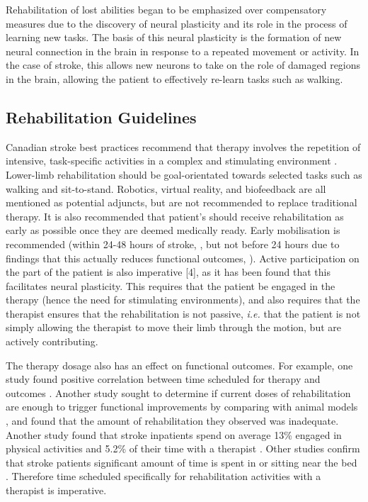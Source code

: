 \documentclass[12pt]{report}
\begin{document}
Rehabilitation of lost abilities began to be emphasized over compensatory measures due to the discovery of neural plasticity and its role in the process of learning new tasks. The basis of this neural plasticity is the formation of new neural connection in the brain in response to a repeated movement or activity. In the case of stroke, this allows new neurons to take on the role of damaged regions in the brain, allowing the patient to effectively re-learn tasks such as walking. 

\subsection{Rehabilitation Guidelines}

Canadian stroke best practices recommend that therapy involves the repetition of intensive, task-specific activities in a complex and stimulating environment \cite{Hebert2016}. Lower-limb rehabilitation should be goal-orientated towards selected tasks such as walking and sit-to-stand. Robotics, virtual reality, and biofeedback are all mentioned as potential adjuncts, but are not recommended to replace traditional therapy. It is also recommended that patient's should receive rehabilitation as early as possible once they are deemed medically ready. Early mobilisation is recommended (within 24-48 hours of stroke, \cite{Casaubon2016}, but not before 24 hours due to findings that this actually reduces functional outcomes, \cite{AVERTTrialCollaborationgroup2015}). Active participation on the part of the patient is also imperative [4], as it has been found that this facilitates neural plasticity. This requires that the patient be engaged in the therapy (hence the need for stimulating environments), and also requires that the therapist ensures that the rehabilitation is not passive, \textit{i.e.} that the patient is not simply allowing the therapist to move their limb through the motion, but are actively contributing. 

The therapy dosage also has an effect on functional outcomes. For example, one study found positive correlation between time scheduled for therapy and outcomes \cite{Lohse2014}. Another study sought to determine if current doses of rehabilitation are enough to trigger functional improvements by comparing with animal models \cite{Lang2009}, and found that the amount of rehabilitation they observed was inadequate. Another study found that stroke inpatients spend on average 13\% engaged in physical activities and 5.2\% of their time with a therapist \cite{Bernhardt2004}. Other studies confirm that stroke patients significant amount of time is spent in or sitting near the bed \cite{King2011}. Therefore time scheduled specifically for rehabilitation activities with a therapist is imperative. 
\end{document}
